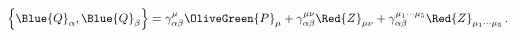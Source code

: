 \begin{equation}
  \left\{\Blue{Q}_\alpha ,\Blue{Q}_\beta  \right\}=\gamma^\mu _{\alpha \beta } \OliveGreen{P}_\mu
+\gamma ^{\mu \nu } _{\alpha \beta }\Red{Z}_{\mu \nu }+\gamma
^{\mu_1\cdots \mu_5 } _{\alpha \beta }\Red{Z}_{\mu_1\cdots \mu_5 }\,.
 \label{QQD11}
\end{equation}

